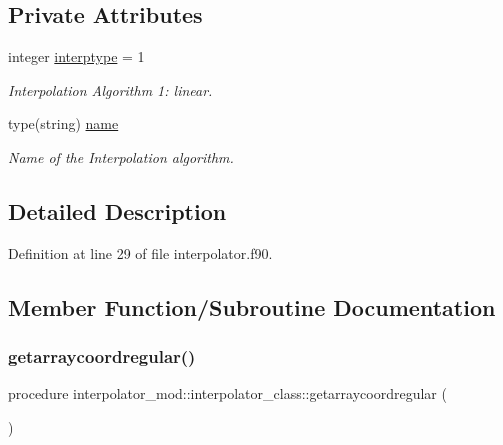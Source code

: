\subsection*{Private Attributes}
\begin{DoxyCompactItemize}
\item 
integer \mbox{\hyperlink{structinterpolator__mod_1_1interpolator__class_afdfac8b305fd660e113fcc4b2145a8da}{interptype}} = 1
\begin{DoxyCompactList}\small\item\em Interpolation Algorithm 1\+: linear. \end{DoxyCompactList}\item 
type(string) \mbox{\hyperlink{structinterpolator__mod_1_1interpolator__class_ac0d7be3d07fb72dec420461e031d6983}{name}}
\begin{DoxyCompactList}\small\item\em Name of the Interpolation algorithm. \end{DoxyCompactList}\end{DoxyCompactItemize}


\subsection{Detailed Description}


Definition at line 29 of file interpolator.\+f90.



\subsection{Member Function/\+Subroutine Documentation}
\mbox{\label{structinterpolator__mod_1_1interpolator__class_ad95ae9cbdbc00c17ef2c463b58e23678}} 
\subsubsection{\texorpdfstring{getarraycoordregular()}{getarraycoordregular()}}
{\footnotesize\ttfamily procedure interpolator\+\_\+mod\+::interpolator\+\_\+class\+::getarraycoordregular (\begin{DoxyParamCaption}{ }\end{DoxyParamCaption})\hspace{0.3cm}{\ttfamily [private]}}



